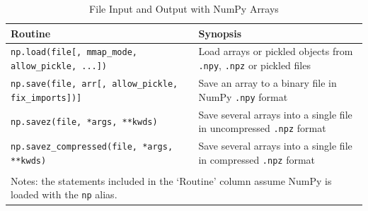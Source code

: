 \documentclass[a4paper,11pt]{book}
\begin{document}
\begin{table}
	\centering 
	\caption{File Input and Output with NumPy Arrays}
	\label{tab:array_io}
	\begin{tabular}{ll}
		\toprule\toprule
		Routine & Synopsis\\
		\midrule
                \texttt{np.load(file[, mmap\_mode, allow\_pickle, ...])} & Load arrays or pickled objects from \texttt{.npy}, \texttt{.npz} or pickled files\\
		\texttt{np.save(file, arr[, allow\_pickle, fix\_imports])]} & Save an array to a binary file in NumPy \texttt{.npy} format\\
		\texttt{np.savez(file, *args, **kwds)} & Save several arrays into a single file in uncompressed \texttt{.npz} format\\
		\texttt{np.savez\_compressed(file, *args, **kwds)} & Save several arrays into a single file in compressed \texttt{.npz} format\\
	     	\bottomrule \\[-1.8ex]
	        \multicolumn{2}{l}{Notes: the statements included in the `Routine' column assume NumPy is loaded with the \texttt{np} alias.} \\
	\end{tabular}
\end{table}
\clearpage
\end{document}
